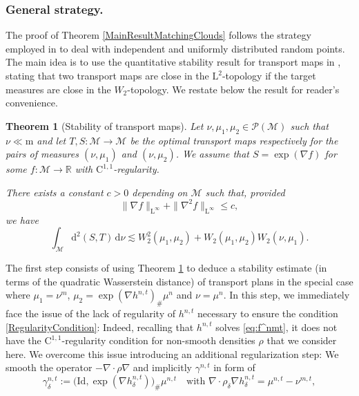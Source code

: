 \documentclass[11pt,a4paper,oneside]{amsart}
\numberwithin{equation}{section}
\newtheorem{theorem}{Theorem}[section]
\newcommand{\dd}{\mathrm{d}}
\newcommand{\LL}{\mathrm{L}}
\newcommand{\m}{\mathrm{m}}
\begin{document}
\subsubsection*{General strategy.}The proof of Theorem \ref{MainResultMatchingClouds} follows the strategy employed in \cite{ambrosio2019optimal} to deal with independent and uniformly distributed random points. 
The main idea is to use the quantitative stability result for transport maps in \cite[Theorem 3.2]{ambrosio2019optimal}, stating that two transport maps are close in the $\LL^2$-topology if the target measures are close in the $W_2$-topology. We restate below the result for reader's convenience.
%
\begin{theorem}[Stability of transport maps]\label{StabilityResultMap}
%
Let $\nu,\mu_1,\mu_2\in \mathcal{P}(\mathcal{M})$ such that $\nu\ll \m$ and let $T,S: \mathcal{M}\rightarrow\mathcal{M}$ be the optimal transport maps respectively for the pairs of measures $(\nu,\mu_1)$ and $(\nu,\mu_2)$. We assume that $S=\exp(\nabla f)$ for some $f:\mathcal{M}\rightarrow\mathbb{R}$ with $\mathrm{C}^{1,1}$-regularity. 

%
\medskip
%

\noindent There exists a constant $c>0$ depending on $\mathcal{M}$ such that, provided 
%
\begin{equation}\label{RegularityCondition}
%
\|\nabla f\|_{\LL^\infty}+\|\nabla^2 f\|_{\LL^\infty}\leq c,
%
\end{equation}
%
we have 
%
$$\int_{\mathcal{M}}\dd^2(S,T)\,\dd\nu\lesssim W^2_2(\mu_1,\mu_2)+W_2(\mu_1,\mu_2)W_2(\nu,\mu_1).$$
%
\end{theorem}
%
The first step consists of using Theorem \ref{StabilityResultMap} to deduce a stability estimate (in terms of the quadratic Wasserstein distance) of transport plans in the special case where $\mu_1=\nu^m$, $\mu_2=\exp(\nabla h^{n,t})_\#\mu^n$ and $\nu=\mu^n$. In this step, we immediately face the issue of the lack of regularity of $h^{n,t}$ necessary to ensure the condition \eqref{RegularityCondition}: Indeed, recalling that $h^{n,t}$ solves \eqref{eq:f^nmt}, it does not have the $\mathrm{C}^{1,1}$-regularity condition for non-smooth densities $\rho$ that we consider here. We overcome this issue introducing an additional regularization step: We smooth  the operator $-\nabla \cdot \rho \nabla$ and implicitly $\gamma^{n,t}$ in form of 
%
\begin{equation}\label{RegularizationIntro}
%
\gamma^{n,t}_{\delta}:=\big(\text{Id},\exp(\nabla h^{n,t}_\delta)\big)_\#\mu^{n,t}\quad \text{with }\nabla\cdot\rho_\delta\nabla h^{n,t}_\delta=\mu^{n,t}-\nu^{m,t},
%
\end{equation}
\end{document}
